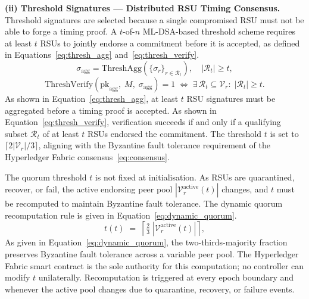 \textbf{(ii) Threshold Signatures — Distributed RSU Timing Consensus.}
Threshold signatures are selected because a single compromised RSU
must not be able to forge a timing proof. A $t$-of-$n$ ML-DSA-based threshold scheme requires at least
$t$ RSUs to jointly endorse a commitment before it is accepted,
as defined in Equations~\eqref{eq:thresh_agg} and~\eqref{eq:thresh_verify}.
\begin{equation}
\sigma_{\mathrm{agg}} =
  \mathrm{ThreshAgg}\!\left(
    \{\sigma_r\}_{r\in\mathcal{R}_t}
  \right),
  \quad |\mathcal{R}_t| \geq t,
\label{eq:thresh_agg}
\end{equation}
\begin{equation}
\mathrm{ThreshVerify}\!\left(
  \mathrm{pk}_{\mathrm{agg}},\;M,\;\sigma_{\mathrm{agg}}
\right) = 1
\;\iff\;
\exists\,\mathcal{R}_t\subseteq\mathcal{V}_r:\;|\mathcal{R}_t|\geq t.
\label{eq:thresh_verify}
\end{equation}
As shown in Equation~\eqref{eq:thresh_agg}, at least $t$ RSU
signatures must be aggregated before a timing proof is accepted.
As shown in Equation~\eqref{eq:thresh_verify}, verification
succeeds if and only if a qualifying subset $\mathcal{R}_t$
of at least $t$ RSUs endorsed the commitment. The threshold
$t$ is set to $\lceil 2|\mathcal{V}_r|/3\rceil$,
aligning with the Byzantine fault tolerance requirement of
the Hyperledger Fabric consensus~\eqref{eq:consensus}. 



The quorum threshold $t$ is not fixed at initialisation.
As RSUs are quarantined, recover, or fail, the active endorsing
peer pool $|\mathcal{V}_r^{\mathrm{active}}(t)|$ changes, and
$t$ must be recomputed to maintain Byzantine fault tolerance.
The dynamic quorum recomputation rule is given in
Equation~\eqref{eq:dynamic_quorum}.
%
\begin{equation}
  t(t) \;=\;
    \left\lceil \tfrac{2}{3}\;
      |\mathcal{V}_r^{\mathrm{active}}(t)|
    \right\rceil,
  \label{eq:dynamic_quorum}
\end{equation}
%
As given in Equation~\eqref{eq:dynamic_quorum}, the
two-thirds-majority fraction preserves Byzantine fault tolerance
across a variable peer pool. The Hyperledger Fabric smart
contract is the sole authority for this computation; no
controller can modify $t$ unilaterally. Recomputation is
triggered at every epoch boundary and whenever the active pool
changes due to quarantine, recovery, or failure events.

